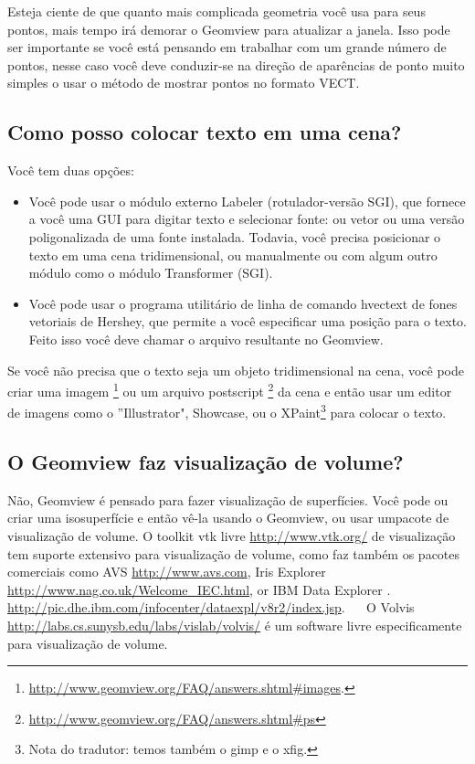 \documentclass[12pt,a4paper]{article}
\begin{document}
        Esteja ciente de que quanto mais complicada geometria voc\^e usa para seus pontos,
        mais tempo ir\'a demorar o Geomview para atualizar a janela. Isso pode ser
        importante se voc\^e est\'a pensando em trabalhar com um grande n\'umero de pontos, nesse caso
        voc\^e deve conduzir-se na dire\c{c}\~ao de apar\^encias de ponto muito simples o usar o m\'etodo de
        mostrar pontos no formato VECT.

    \subsection{Como posso colocar texto em uma cena?}

        Voc\^e tem duas op\c{c}\~oes:
          \begin{itemize}
          \item Voc\^e pode usar o m\'{o}dulo externo Labeler (rotulador-vers\~ao SGI), que fornece a voc\^e uma GUI para
            digitar texto e selecionar fonte: ou vetor ou uma vers\~ao
            poligonalizada de uma fonte instalada. Todavia, voc\^e precisa posicionar o texto em uma cena
            tridimensional, ou manualmente ou com algum outro m\'{o}dulo como o m\'{o}dulo
            Transformer (SGI).
          \item Voc\^e pode usar o programa utilit\'ario de linha de comando hvectext de fones vetoriais de
            Hershey, que permite a voc\^e especificar uma posi\c{c}\~ao para o texto.
            Feito isso voc\^e deve chamar o arquivo resultante no Geomview.
          \end{itemize}
        Se voc\^e n\~ao precisa que o texto seja um objeto tridimensional na cena, voc\^e pode
        criar uma imagem \footnote{\url{http://www.geomview.org/FAQ/answers.shtml\#images}.}
        ou um arquivo postscript \footnote{\url{http://www.geomview.org/FAQ/answers.shtml\#ps}}
        da cena e ent\~ao usar um editor de imagens como o ''Illustrator",
        Showcase, ou o XPaint\footnote{Nota do tradutor: temos tamb\'em o gimp e o xfig.} para colocar o texto.

    \subsection{O Geomview faz visualiza\c{c}\~ao de volume?}

        N\~ao, Geomview \'e pensado para fazer visualiza\c{c}\~ao de superf\'icies. Voc\^e pode ou
        criar uma isosuperf\'icie e ent\~ao v\^e-la usando o Geomview, ou usar umpacote de
        visualiza\c{c}\~ao de volume. O toolkit vtk livre \url{http://www.vtk.org/}
        de visualiza\c{c}\~ao tem suporte extensivo para visualiza\c{c}\~ao de volume, como faz tamb\'em
        os pacotes comerciais como AVS \url{http://www.avs.com}, Iris Explorer
        \url{http://www.nag.co.uk/Welcome\_IEC.html}, or IBM Data Explorer
        . \url{http://pic.dhe.ibm.com/infocenter/dataexpl/v8r2/index.jsp}. \,\,\,\,\,\,\,\,O Volvis
        \url{http://labs.cs.sunysb.edu/labs/vislab/volvis/} \'e um software livre especificamente para
        visualiza\c{c}\~ao de volume.
\end{document}
